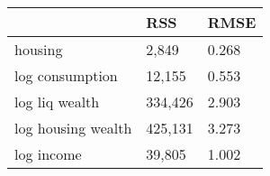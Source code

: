 \begin{table}[htbp]
\begin{tabular}{lll} \hline \hline
 & RSS  & RMSE  \\  \hline 
housing &     2,849 &     0.268 \\  
log consumption &    12,155 &     0.553 \\  
log liq wealth &   334,426 &     2.903 \\  
log housing wealth &   425,131 &     3.273 \\  
log income &    39,805 &     1.002 \\  
\hline \hline \end{tabular}
\end{table}
